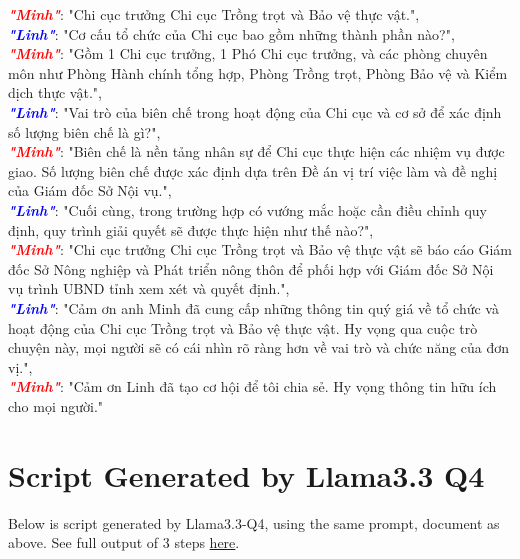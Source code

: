 \documentclass[12pt]{article}
\begin{document}
{\begin{minipage}{\textwidth}
\textcolor{red}{\textbf{\textit{"Minh"}}}: "Chi cục trưởng Chi cục Trồng trọt và Bảo vệ thực vật.",\\
\textcolor{blue}{\textbf{\textit{"Linh"}}}: "Cơ cấu tổ chức của Chi cục bao gồm những thành phần nào?",\\
\textcolor{red}{\textbf{\textit{"Minh"}}}: "Gồm 1 Chi cục trưởng, 1 Phó Chi cục trưởng, và các phòng chuyên môn như Phòng Hành chính tổng hợp, Phòng Trồng trọt, Phòng Bảo vệ và Kiểm dịch thực vật.",\\
\textcolor{blue}{\textbf{\textit{"Linh"}}}: "Vai trò của biên chế trong hoạt động của Chi cục và cơ sở để xác định số lượng biên chế là gì?",\\
\textcolor{red}{\textbf{\textit{"Minh"}}}: "Biên chế là nền tảng nhân sự để Chi cục thực hiện các nhiệm vụ được giao. Số lượng biên chế được xác định dựa trên Đề án vị trí việc làm và đề nghị của Giám đốc Sở Nội vụ.",\\
\textcolor{blue}{\textbf{\textit{"Linh"}}}: "Cuối cùng, trong trường hợp có vướng mắc hoặc cần điều chỉnh quy định, quy trình giải quyết sẽ được thực hiện như thế nào?",\\
\textcolor{red}{\textbf{\textit{"Minh"}}}: "Chi cục trưởng Chi cục Trồng trọt và Bảo vệ thực vật sẽ báo cáo Giám đốc Sở Nông nghiệp và Phát triển nông thôn để phối hợp với Giám đốc Sở Nội vụ trình UBND tỉnh xem xét và quyết định.",\\
\textcolor{blue}{\textbf{\textit{"Linh"}}}: "Cảm ơn anh Minh đã cung cấp những thông tin quý giá về tổ chức và hoạt động của Chi cục Trồng trọt và Bảo vệ thực vật. Hy vọng qua cuộc trò chuyện này, mọi người sẽ có cái nhìn rõ ràng hơn về vai trò và chức năng của đơn vị.",\\
\textcolor{red}{\textbf{\textit{"Minh"}}}: "Cảm ơn Linh đã tạo cơ hội để tôi chia sẻ. Hy vọng thông tin hữu ích cho mọi người."
\end{minipage}%
}

\section{Script Generated by Llama3.3 Q4}
Below is script generated by Llama3.3-Q4, using the same prompt, document as above. See full output of 3 steps \href{google.com}{here}.
\end{document}
